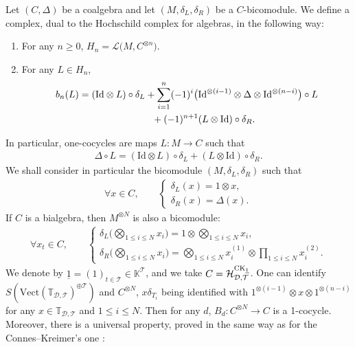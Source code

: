 \documentclass[10pt,a4paper]{amsart}
\numberwithin{equation}{section}
\newcommand{\K}{\mathbb{K}}
\newcommand{\T}{\mathcal{T}}
\newcommand{\D}{\mathcal{D}}
\newcommand{\h}{\mathcal{H}}
\newcommand{\bfT}{\mathbb{T}}
\newcommand{\id}{\mathrm{Id}}
\begin{document}
Let $(C,\Delta)$ be a coalgebra and let $(M,\delta_L,\delta_R)$ be a $C$-bicomodule.
We define a complex, dual to the Hochschild complex for algebras, in the following way:
\begin{enumerate}\itemsep=0pt
\item For any $n\geq 0$, $H_n=\mathcal{L}\big(M,C^{\otimes n}\big)$.
\item For any $L\in H_n$,
\begin{gather*}
b_n(L)=(\id\otimes L)\circ \delta_L+\sum_{i=1}^n (-1)^i \big(\id^{\otimes (i-1)}\otimes \Delta \otimes \id^{\otimes(n-i)}\big)\circ L
\\ \hphantom{b_n(L)=}
{}+(-1)^{n+1}(L\otimes \id)\circ \delta_R.
\end{gather*}
\end{enumerate}
In particular, one-cocycles are maps $L\colon M\longrightarrow C$ such that
\begin{gather*}\Delta \circ L=(\id\otimes L)\circ \delta_L+(L\otimes \id)\circ \delta_R.\end{gather*}
We shall consider in particular the bicomodule $(M,\delta_L,\delta_R)$ such that
\begin{gather*}
\forall x\in C,\qquad \begin{cases}
\delta_L(x)=1\otimes x,\\
\delta_R(x)=\Delta(x).
\end{cases}
\end{gather*}
If $C$ is a bialgebra, then $M^{\otimes N}$ is also a bicomodule:
\begin{align*}
\forall x_t\in C,\qquad
\begin{cases}
\displaystyle \delta_L\Big(\bigotimes_{1\leq i \leq N} x_i\Big)=1\otimes \bigotimes_{1\leq i \leq N} x_i,\\[5mm]
\displaystyle \delta_R\Big(\bigotimes_{1\leq i \leq N} x_i\Big)
=\bigotimes_{1\leq i \leq N} x_i^{(1)}\otimes \prod_{1\leq i \leq N} x_i^{(2)}.
\end{cases} \end{align*}
We denote by $\underline{1}=(1)_{t\in \T} \in \K^\T$, and we take $C=\h_{\D,\T}^{{\rm CK}_{\underline{1}}}$.
One can identify $S\left(\mathrm{Vect}(\bfT_{\D,\T})^{\oplus \T}\right)$ and $C^{\otimes N}$,
$x\delta_{T_i}$ being identified with $1^{\otimes (i-1)}\otimes x\otimes 1^{\otimes (n-i)}$
for any $x\in \bfT_{\D,\T}$ and $1\leq i \leq N$. Then for any $d$,
$B_d\colon C^{\otimes N}\longrightarrow C$ is a 1-cocycle. Moreover, there is a universal property,
proved in the same way as for the Connes--Kreimer's one \cite{ConnesKreimer}:
\end{document}
